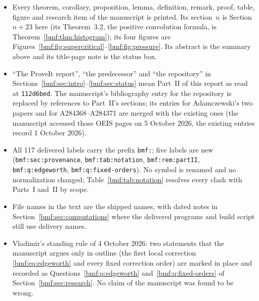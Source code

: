 \documentclass[11pt]{article}
\numberwithin{equation}{section}
\theoremstyle{definition}
\theoremstyle{remark}
\begin{document}
\begin{itemize}[leftmargin=*,itemsep=1pt]
\item Every theorem, corollary, proposition, lemma, definition, remark,
proof, table, figure and research item of the manuscript is printed. Its
section~$n$ is Section~$n+23$ here (its Theorem~3.2, the positive convolution formula, is
Theorem~\ref{bmf:thm:histogram}); its four figures are
Figures~\ref{bmf:fig:supercritical}--\ref{bmf:fig:pressure}. Its abstract is
the summary above and its title-page note is the status box.
\item ``The ProveIt report'', ``the predecessor'' and ``the repository'' in
Sections~\ref{bmf:sec:intro}--\ref{bmf:sec:status} mean Part~II of this
report as read at \texttt{112d6bed}. The manuscript's bibliography entry for
the repository is replaced by references to Part~II's sections; its
entries for Adamczewski's two papers and for A284368--A284371 are merged
with the existing ones (the manuscript accessed those OEIS pages on
5 October 2026, the existing entries record 1 October 2026).
\item All 117 delivered labels carry the prefix \texttt{bmf:}; five labels
are new (\texttt{bmf:sec:provenance}, \texttt{bmf:tab:notation},
\texttt{bmf:rem:partII}, \texttt{bmf:q:edgeworth},
\texttt{bmf:q:fixed-orders}). No symbol is renamed and no normalization
changed; Table~\ref{bmf:tab:notation} resolves every clash with Parts~I
and~II by scope.
\item File names in the text are the shipped names, with dated notes in
Section~\ref{bmf:sec:computations} where the delivered programs and build
script still use delivery names.
\item Vladimir's standing rule of 4 October 2026: two statements that the
manuscript argues only in outline (the first local correction
\eqref{bmf:eq:edgeworth} and every fixed correction order) are marked in
place and recorded as Questions~\ref{bmf:q:edgeworth}
and~\ref{bmf:q:fixed-orders} of Section~\ref{bmf:sec:research}. No claim of
the manuscript was found to be wrong.
\end{itemize}
\end{document}
